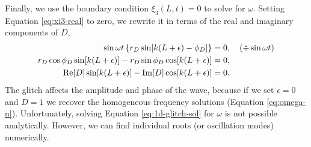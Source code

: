 Finally, we use the boundary condition \(\xi_3(L, t) = 0\) to solve for \(\omega\). Setting Equation \ref{eq:xi3-real} to zero, we rewrite it in terms of the real and imaginary components of \(D\),
%
\begin{align}
    \sin \omega t \left\{r_D \sin[k(L + \epsilon) - \phi_D]\right\} &= 0, \quad (\div \sin \omega t) \notag \\
    r_D \cos \phi_D \sin[k(L + \epsilon)] - r_D \sin \phi_D \cos[k(L + \epsilon)] &= 0, \notag \\
    {\mathrm{Re}}[D] \sin[k(L + \epsilon)] - {\mathrm{Im}}[D] \cos[k(L + \epsilon)] &=0. \label{eq:1d-glitch-sol}
\end{align}
%
The glitch affects the amplitude and phase of the wave, because if we set \(\epsilon = 0\) and \(D = 1\) we recover the homogeneous frequency solutions (Equation \ref{eq:omega-n}). Unfortunately, solving Equation \ref{eq:1d-glitch-sol} for \(\omega\) is not possible analytically. However, we can find individual roots (or oscillation modes) numerically.

